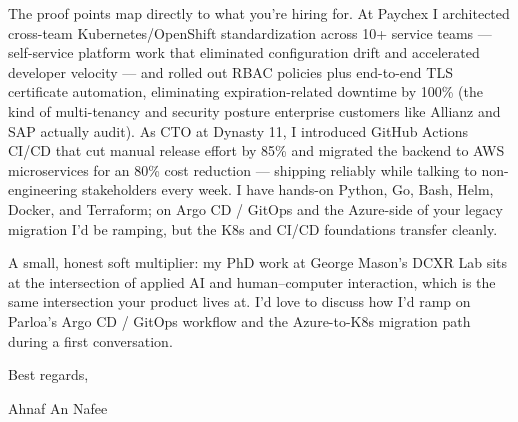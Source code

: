 \documentclass[letterpaper,11pt]{article}
\begin{document}
The proof points map directly to what you're hiring for. At Paychex I architected cross-team Kubernetes/OpenShift standardization across 10+ service teams --- self-service platform work that eliminated configuration drift and accelerated developer velocity --- and rolled out RBAC policies plus end-to-end TLS certificate automation, eliminating expiration-related downtime by 100\% (the kind of multi-tenancy and security posture enterprise customers like Allianz and SAP actually audit). As CTO at Dynasty 11, I introduced GitHub Actions CI/CD that cut manual release effort by 85\% and migrated the backend to AWS microservices for an 80\% cost reduction --- shipping reliably while talking to non-engineering stakeholders every week. I have hands-on Python, Go, Bash, Helm, Docker, and Terraform; on Argo CD / GitOps and the Azure-side of your legacy migration I'd be ramping, but the K8s and CI/CD foundations transfer cleanly.

A small, honest soft multiplier: my PhD work at George Mason's DCXR Lab sits at the intersection of applied AI and human--computer interaction, which is the same intersection your product lives at. I'd love to discuss how I'd ramp on Parloa's Argo CD / GitOps workflow and the Azure-to-K8s migration path during a first conversation.

Best regards,

\vspace{18pt}
Ahnaf An Nafee
\end{document}
